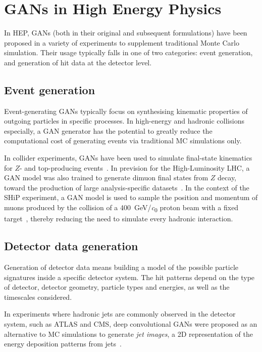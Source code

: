 \section{GANs in High Energy Physics}
In HEP, GANs (both in their original and subsequent formulations) have been
proposed in a variety of experiments to supplement traditional Monte Carlo
simulation. Their usage typically falls in one of two categories: event
generation, and generation of hit data at the detector level.

\subsection{Event generation}
Event-generating GANs typically focus on synthesising kinematic properties of
outgoing particles in specific processes. In high-energy and hadronic collisions
especially, a GAN generator has the potential to greatly reduce the
computational cost of generating events via traditional MC simulations only.

In collider experiments, GANs have been used to simulate final-state kinematics
for $Z$- and top-producing events~\cite{butter_how_2019, otten_event_2019}. In
prevision for the High-Luminosity LHC, a GAN model was also trained to generate
dimuon final states from $Z$ decay, toward the production of large
analysis-specific datasets~\cite{hashemi2019lhc}. In the context of the SHiP
experiment, a GAN model is used to sample the position and momentum of muons
produced by the collision of a \SI{400}{\GeV/\clight} proton beam with a fixed
target~\cite{ahdida_fast_2019}, thereby reducing the need to simulate every
hadronic interaction.


\subsection{Detector data generation}
Generation of detector data means building a model of the possible particle
signatures inside a specific detector system. The hit patterns depend on the
type of detector, detector geometry, particle types and energies, as well as the
timescales considered.

In experiments where hadronic jets are commonly observed in the detector system,
such as ATLAS and CMS, deep convolutional GANs were proposed as an alternative
to MC simulations to generate \emph{jet images}, a 2D representation of the
energy deposition patterns from jets~\cite{deOliveira2017a}.

